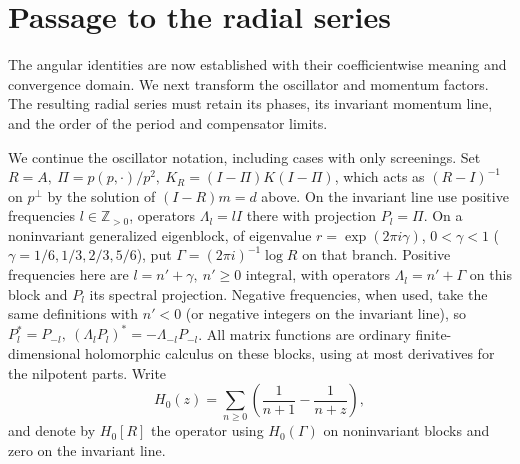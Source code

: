 \section{Passage to the radial series}\label{c4:radial}

The angular identities are now established with their coefficientwise meaning and convergence domain.  We next transform the oscillator and momentum factors.  The resulting radial series must retain its phases, its invariant momentum line, and the order of the period and compensator limits.


We continue the oscillator notation, including cases with only screenings. Set \(R=A,\ \Pi=p(p,\cdot)/p^2,\ K_R=(I-\Pi)K(I-\Pi)\), which acts as \((R-I)^{-1}\) on \(p^\perp\) by the solution of \((I-R)m=d\) above. On the invariant line use positive frequencies \(l\in\mathbb Z_{>0}\), operators \(\Lambda_l=l I\) there with projection \(P_l=\Pi\). On a noninvariant generalized eigenblock, of eigenvalue \(r=\exp(2\pi i\gamma)\), \(0<\gamma<1\) (\(\gamma=1/6,1/3,2/3,5/6\)), put \(\Gamma=(2\pi i)^{-1}\log R\) on that branch. Positive frequencies here are \(l=n'+\gamma,\ n'\ge0\) integral, with operators \(\Lambda_l=n'+\Gamma\) on this block and \(P_l\) its spectral projection. Negative frequencies, when used, take the same definitions with \(n'<0\) (or negative integers on the invariant line), so \(P_l^*=P_{-l},\ (\Lambda_l P_l)^*=-\Lambda_{-l}P_{-l}\). All matrix functions are ordinary finite-dimensional holomorphic calculus on these blocks, using at most derivatives for the nilpotent parts. Write
\[
 H_0(z)=\sum_{n\ge0}\left(\frac1{n+1}-\frac1{n+z}\right),
\]
and denote by \(H_0[R]\) the operator using \(H_0(\Gamma)\) on noninvariant blocks and zero on the invariant line.

